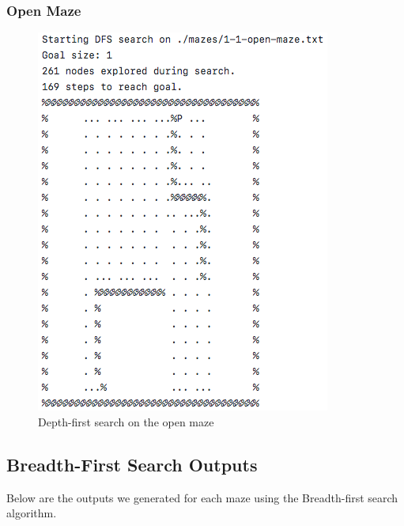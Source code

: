 \documentclass[titlepage]{article}
\begin{document}
\subsubsection{Open Maze}
\begin{figure}[h!]
\includegraphics[width=\linewidth]{dfsopen.png}
\caption{Depth-first search on the open maze}
\label{fig:DFSopen}
\end{figure}

\newpage
\subsection{Breadth-First Search Outputs}
Below are the outputs we generated for each maze using the Breadth-first search algorithm. 
\end{document}
